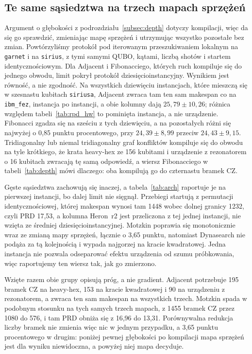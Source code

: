 \documentclass[11pt,a4paper]{article}
\begin{document}
\subsection{Te same sąsiedztwa na trzech mapach sprzężeń}
\label{subsec:arch}
Argument o głębokości z podrozdziału~\ref{subsec:depth} dotyczy kompilacji,
więc da się go sprawdzić, zmieniając mapę sprzężeń i utrzymując wszystko
pozostałe bez zmian. Powtórzyliśmy protokół pod iterowanym przeszukiwaniem
lokalnym na \texttt{garnet} i na \texttt{sirius}, z tymi samymi QUBO, kątami,
liczbą shotów i startem identycznościowym. Dla Adjacent i Fibonacciego,
których ruch kompiluje się do jednego obwodu, limit pokrył protokół
dziesięcioinstancyjny. Wynikiem jest równość, a nie zgodność. Na wszystkich
dziewięciu instancjach, które mieszczą się w szesnastu kubitach
\texttt{siriusa}, Adjacent zwraca tam ten sam makespan co na
\texttt{ibm\_fez}, instancja po instancji, a obie kolumny dają $25{,}79 \pm 10{,}26$;
różnica względem tabeli~\ref{tab:rpd_hw} to pominięta instancja, a nie
urządzenie. Fibonacci zgadza się na sześciu z tych dziewięciu, a na
pozostałych różni się najwyżej o 0,85 punktu procentowego, przy
$24{,}39 \pm 8{,}99$ przeciw $24{,}43 \pm 9{,}15$. Tridiagonalny lub niemal
tridiagonalny graf konfliktów kompiluje się do obwodu na tyle krótkiego, że
krata heavy-hex ze 156 kubitami i urządzenie z rezonatorem o 16 kubitach
zwracają tę samą odpowiedź, a wiersz Fibonacciego w tabeli~\ref{tab:depth}
mówi dlaczego: oba kompilują go do czternastu bramek CZ.

Gęste sąsiedztwa zachowują się inaczej, a tabela~\ref{tab:arch} raportuje je
na pierwszej instancji, bo dalej limit nie sięgnął. Przebiegi startują
z permutacji identycznościowej, której makespan wynosi tam 1448 wobec dolnej
granicy 1232, czyli PRD 17,53, a kolumna Heron~r2 jest przeliczona z tej jednej
instancji, nie wzięta ze średniej dziesięcioinstancyjnej. Motzkin poprawia się
monotonicznie wraz ze zmianą mapy sprzężeń, łącznie o 3,65 punktu, natomiast
Dynasearch nie podąża za tą kolejnością i wypada najgorzej na kracie
kwadratowej. Jedna instancja nie pozwala odseparować efektu urządzenia od
szumu próbkowania, więc raportujemy ten wiersz tak, jak go zmierzono.

Wzięte razem obie grupy opisują próg, a nie gradient. Adjacent potrzebuje 195
bramek CZ na heavy-hex, 153 na kracie kwadratowej i 90 na urządzeniu
z rezonatorem, a zwraca ten sam makespan na wszystkich trzech. Motzkin spada
w podobnym stosunku na tych samych trzech mapach, z 1455 bramek CZ przez 1080
do 576, i tam PRD obniża się z 16,96 do 13,31. Porównywalna redukcja liczby
bramek nie zmienia więc nic w jednym przypadku, a 3,65 punktu procentowego
w drugim: poniżej pewnej głębokości po kompilacji mapa sprzężeń jest dla
wyniku niewidoczna, a powyżej niej mapa decyduje.
\end{document}
